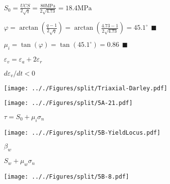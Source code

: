 \documentclass[onecolumn,11pt]{report}
\def\lthtmlcheckvsize{\ifdim\ht\sizebox<\vsize 
  \ifdim\wd\sizebox<\hsize\expandafter\hfill\fi \expandafter\vfill
  \else\expandafter\vss\fi}%
\begin{document}
{\newpage\clearpage
{}%
$\displaystyle S_0 = \frac{UCS}{2 \sqrt{q}} = \frac{80 \text{MPa}}{2 \sqrt{4.73}} = 18.4 \text{MPa} $%
\lthtmlindisplaymathZ
\lthtmlcheckvsize\clearpage}

{\newpage\clearpage
{}%
$\displaystyle \varphi = \arctan \left( \frac{q-1}{2\sqrt{q}} \right) 
        = \arctan \left( \frac{4.73-1}{2\sqrt{4.73}} \right) = 45.1^{\circ} \: \: \blacksquare
$%
\lthtmlindisplaymathZ
\lthtmlcheckvsize\clearpage}

{\newpage\clearpage
{}%
$\displaystyle \mu_i = \tan (\varphi) = \tan (45.1^{\circ}) = 0.86 
\: \: \blacksquare
$%
\lthtmlindisplaymathZ
\lthtmlcheckvsize\clearpage}

{\newpage\clearpage
{}%
$ \varepsilon_v = \varepsilon_a + 2\varepsilon_r$%
\lthtmlindisplaymathZ
\lthtmlcheckvsize\clearpage}

{\newpage\clearpage
{}%
$ d \varepsilon_v/dt<0$%
\lthtmlindisplaymathZ
\lthtmlcheckvsize\clearpage}

{\newpage\clearpage
{}%
\texttt{[image: .././Figures/split/Triaxial-Darley.pdf]}%
\lthtmlpictureZ
\lthtmlcheckvsize\clearpage}

{\newpage\clearpage
{}%
\texttt{[image: .././Figures/split/5A-21.pdf]}%
\lthtmlpictureZ
\lthtmlcheckvsize\clearpage}

{\newpage\clearpage
{}%
$ \tau = S_0 + \mu_i \sigma_n$%
\lthtmlindisplaymathZ
\lthtmlcheckvsize\clearpage}

{\newpage\clearpage
{}%
\texttt{[image: .././Figures/split/5B-YieldLocus.pdf]}%
\lthtmlpictureZ
\lthtmlcheckvsize\clearpage}

{\newpage\clearpage
{}%
$ \beta_w$%
\lthtmlindisplaymathZ
\lthtmlcheckvsize\clearpage}

{\newpage\clearpage
{}%
$ S_w + \mu_w \sigma_n$%
\lthtmlindisplaymathZ
\lthtmlcheckvsize\clearpage}

{\newpage\clearpage
{}%
\texttt{[image: .././Figures/split/5B-8.pdf]}%
\lthtmlpictureZ
\lthtmlcheckvsize\clearpage}
\end{document}
